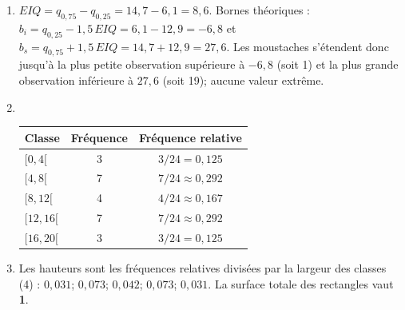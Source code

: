 \begin{exercice}
\begin{solution}
\begin{enumerate}[label=(\alph*)]
  $q_{0,5}=0,5\,x_{(12)}+0,5\,x_{(13)}=0,5(9)+0,5(10)=9,5$.
  Premier quartile : $0,25\times 24+0,5=6,5^{\text{e}}$ statistique d'ordre, donc
  $q_{0,25}=0,5(6)+0,5(6,2)=6,1$.
  Troisième quartile : $0,75\times 24+0,5=18,5^{\text{e}}$ statistique d'ordre, donc
  $q_{0,75}=0,5(14,6)+0,5(14,8)=14,7$.
  \item $EIQ=q_{0,75}-q_{0,25}=14,7-6,1=8,6$. Bornes théoriques :
  $b_i=q_{0,25}-1,5\,EIQ=6,1-12,9=-6,8$ et $b_s=q_{0,75}+1,5\,EIQ=14,7+12,9=27,6$.
  Les moustaches s'étendent donc jusqu'à la plus petite observation supérieure à $-6,8$
  (soit 1) et la plus grande observation inférieure à $27,6$ (soit 19); aucune valeur
  extrême.
  \begin{center}
  \end{center}
  \item ~
  \begin{center}
  \begin{tabular}{lcc}
    \toprule
    Classe & Fréquence & Fréquence relative\\
    \midrule
    $[0,4[$   & 3 & $3/24=0,125$ \\
    $[4,8[$   & 7 & $7/24\approx0,292$ \\
    $[8,12[$  & 4 & $4/24\approx0,167$ \\
    $[12,16[$ & 7 & $7/24\approx0,292$ \\
    $[16,20[$ & 3 & $3/24=0,125$ \\
    \bottomrule
  \end{tabular}
  \end{center}
  \item Les hauteurs sont les fréquences relatives divisées par la largeur des classes (4) :
  $0,031$; $0,073$; $0,042$; $0,073$; $0,031$. La surface totale des rectangles vaut
  \textbf{1}.
  \begin{center}
\end{center}
\end{enumerate}
\end{solution}
\end{exercice}
